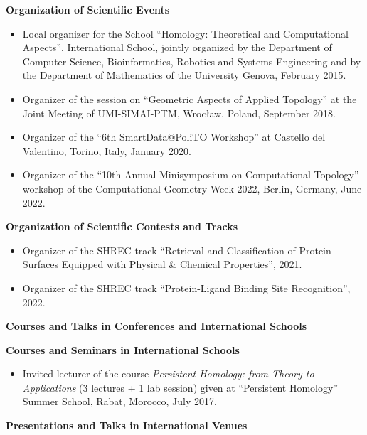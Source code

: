 \documentclass[11pt]{article}
\begin{document}
\vspace*{1ex}
\noindent
{\bf Organization of Scientific Events}
\begin{itemize}
\item Local organizer for the School ``Homology: Theoretical and
Computational Aspects'',  International School, jointly organized by the Department of Computer Science, Bioinformatics, Robotics and Systems Engineering and by the Department of Mathematics of the University Genova, February 2015.
\item Organizer of the session on ``Geometric Aspects of Applied Topology'' at the Joint Meeting of UMI-SIMAI-PTM, Wroc\l{}aw, Poland, September 2018.
\item Organizer of the ``6th SmartData@PoliTO Workshop'' at Castello del Valentino, Torino, Italy, January 2020.
\item Organizer of the ``10th Annual Minisymposium on Computational Topology'' workshop of the Computational Geometry Week 2022, Berlin, Germany, June 2022.
\end{itemize}

\vspace*{1ex}
\noindent
{\bf Organization of Scientific Contests and Tracks}
\begin{itemize}
\item Organizer of the SHREC track ``Retrieval and Classification of Protein Surfaces Equipped with Physical \& Chemical Properties'', 2021.
\item Organizer of the SHREC track ``Protein-Ligand Binding Site Recognition'', 2022.
\end{itemize}

\vspace*{2.5ex}
\noindent
{\Large\bf Courses and Talks in Conferences and International Schools}

\vspace*{1.5ex}
\noindent
{\bf Courses and Seminars in International Schools}

\begin{itemize}
  \item Invited lecturer of the course {\em Persistent Homology: from Theory to Applications} (3 lectures + 1 lab session) given at ``Persistent Homology'' Summer School, Rabat, Morocco, July 2017.
\end{itemize}

\vspace*{1ex}
\noindent
{\bf Presentations and Talks in International Venues}
\end{document}
